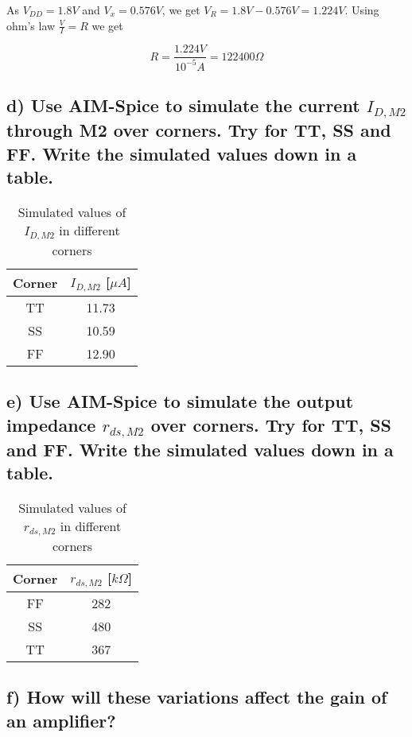 As $V_{DD}=1.8V$ and $V_x=0.576V$, we get $V_{R}=1.8V-0.576V=1.224V$. Using ohm's law $\frac{V}{I}=R$ we get

\[R=\frac{1.224V}{10^{-5}A}=122400\Omega\]



\subsection*{d) Use AIM-Spice to simulate the current $I_{D, M 2}$ through M2 over corners. Try for TT, SS and FF. Write the simulated values down in a table.}

\begin{table}[H]
\centering
\caption{Simulated values of \(I_{D, M 2}\) in different corners}
\label{tab:IDM2_corners}
\begin{tabular}{cc}
\hline
\textbf{Corner} & \textbf{\(I_{D, M 2}\) [\(\mu A\)]} \\
\hline
TT & 11.73 \\
SS & 10.59 \\
FF & 12.90 \\
\hline
\end{tabular}
\end{table}



\subsection*{e) Use AIM-Spice to simulate the output impedance $r_{d s, M 2}$ over corners. Try for TT, SS and FF. Write the simulated values down in a table.}

\begin{table}[H]
    \centering
    \caption{Simulated values of \(r_{d s, M 2}\) in different corners}
    \label{tab:rdsM2_corners}
    \begin{tabular}{cc}
    \hline
    \textbf{Corner} & \textbf{\(r_{d s, M 2}\) [\(k\Omega\)]} \\
    \hline
    FF & 282 \\
    SS & 480 \\
    TT & 367 \\
    \hline
    \end{tabular}
    \end{table}


    \subsection*{f) How will these variations affect the gain of an amplifier?}

